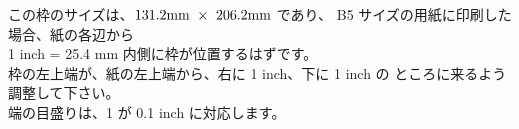 \vfill
\mbox{}\hfill
\begin{minipage}{3in}


この枠のサイズは、$131.2{\rm mm}\ \times\ 206.2{\rm mm}$ であり、
B5 サイズの用紙に印刷した場合、紙の各辺から \\
 1 inch = 25.4 mm 内側に枠が位置するはずです。 \\
枠の左上端が、紙の左上端から、右に 1 inch、下に 1 inch の
ところに来るよう調整して下さい。\\
端の目盛りは、1 が 0.1 inch に対応します。

\end{minipage}
\hfill\mbox{}
\vfill
\mbox{}


